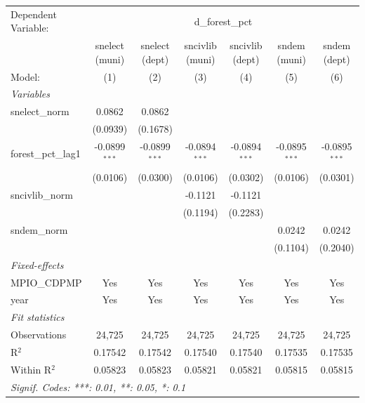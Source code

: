 
\begingroup
\centering
\begin{tabular}{lcccccc}
   \tabularnewline \midrule \midrule
   Dependent Variable: & \multicolumn{6}{c}{d\_forest\_pct}\\
                       & snelect (muni)  & snelect (dept)  & sncivlib (muni) & sncivlib (dept) & sndem (muni)    & sndem (dept) \\   
   Model:              & (1)             & (2)             & (3)             & (4)             & (5)             & (6)\\  
   \midrule
   \emph{Variables}\\
   snelect\_norm       & 0.0862          & 0.0862          &                 &                 &                 &   \\   
                       & (0.0939)        & (0.1678)        &                 &                 &                 &   \\   
   forest\_pct\_lag1   & -0.0899$^{***}$ & -0.0899$^{***}$ & -0.0894$^{***}$ & -0.0894$^{***}$ & -0.0895$^{***}$ & -0.0895$^{***}$\\   
                       & (0.0106)        & (0.0300)        & (0.0106)        & (0.0302)        & (0.0106)        & (0.0301)\\   
   sncivlib\_norm      &                 &                 & -0.1121         & -0.1121         &                 &   \\   
                       &                 &                 & (0.1194)        & (0.2283)        &                 &   \\   
   sndem\_norm         &                 &                 &                 &                 & 0.0242          & 0.0242\\   
                       &                 &                 &                 &                 & (0.1104)        & (0.2040)\\   
   \midrule
   \emph{Fixed-effects}\\
   MPIO\_CDPMP         & Yes             & Yes             & Yes             & Yes             & Yes             & Yes\\  
   year                & Yes             & Yes             & Yes             & Yes             & Yes             & Yes\\  
   \midrule
   \emph{Fit statistics}\\
   Observations        & 24,725          & 24,725          & 24,725          & 24,725          & 24,725          & 24,725\\  
   R$^2$               & 0.17542         & 0.17542         & 0.17540         & 0.17540         & 0.17535         & 0.17535\\  
   Within R$^2$        & 0.05823         & 0.05823         & 0.05821         & 0.05821         & 0.05815         & 0.05815\\  
   \midrule \midrule
   \multicolumn{7}{l}{\emph{Signif. Codes: ***: 0.01, **: 0.05, *: 0.1}}\\
\end{tabular}
\par\endgroup


